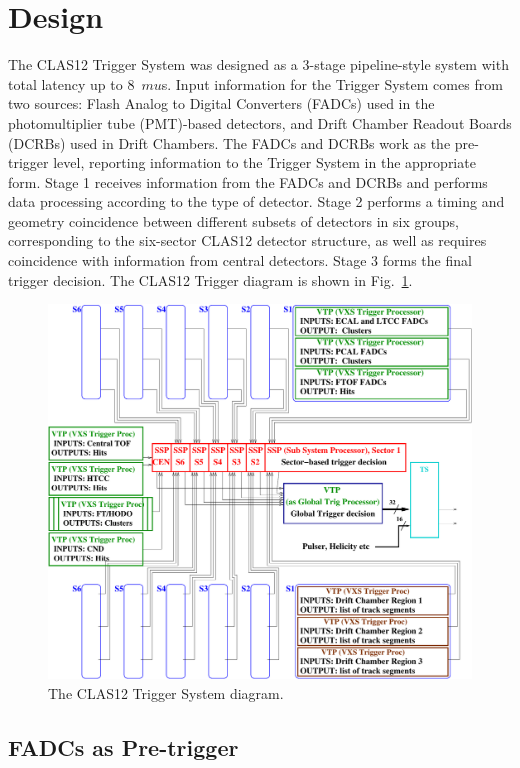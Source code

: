 \section{Design}

The CLAS12 Trigger System was designed as a 3-stage pipeline-style system with total latency up to 8~$mu$s. Input information for the Trigger System comes from two sources:  Flash Analog to Digital Converters (FADCs) used in the photomultiplier tube (PMT)-based detectors, and Drift Chamber Readout Boards (DCRBs) used in Drift Chambers. The FADCs and DCRBs work as the pre-trigger level, reporting information to the Trigger System in the appropriate form. Stage 1 receives information from the FADCs and DCRBs and performs data processing according to the type of detector. Stage 2 performs a timing and geometry coincidence between different subsets of detectors in six groups, corresponding to the six-sector CLAS12 detector structure, as well as requires coincidence with information from central detectors. Stage 3 forms the final trigger decision. The CLAS12 Trigger diagram is shown in Fig.~\ref{fig:TriggerDiagram}.

\begin{figure}[hbt]
	\centering
	\includegraphics[width=1.0\columnwidth,keepaspectratio]{img/CLAS12_TRIGGER_1.pdf}
	\caption{The CLAS12 Trigger System diagram.}
	\label{fig:TriggerDiagram}
\end{figure}


\subsection{FADCs as Pre-trigger}

